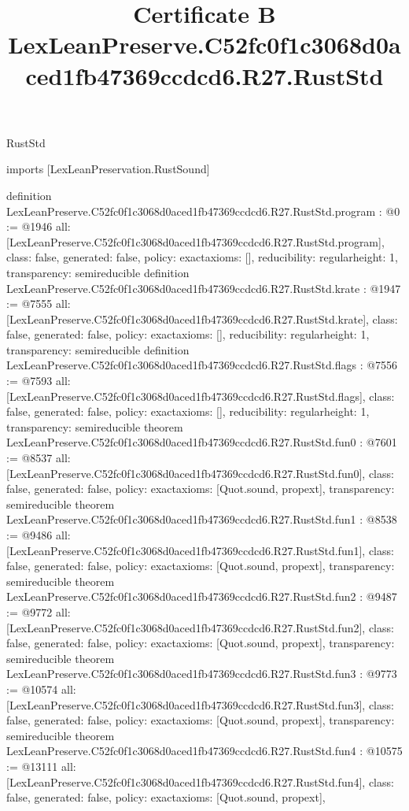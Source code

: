 \begin{lexlean}{RustStd}
\title{Certificate B LexLeanPreserve.C52fc0f1c3068d0aced1fb47369ccdcd6.R27.RustStd}
\begin{coremodule}
imports [LexLeanPreservation.RustSound]

definition LexLeanPreserve.C52fc0f1c3068d0aced1fb47369ccdcd6.R27.RustStd.program : @0 := @1946 {
  all: [LexLeanPreserve.C52fc0f1c3068d0aced1fb47369ccdcd6.R27.RustStd.program],
  class: false,
  generated: false,
  policy: exact{axioms: []},
  reducibility: regular{height: 1},
  transparency: semireducible
}
definition LexLeanPreserve.C52fc0f1c3068d0aced1fb47369ccdcd6.R27.RustStd.krate : @1947 := @7555 {
  all: [LexLeanPreserve.C52fc0f1c3068d0aced1fb47369ccdcd6.R27.RustStd.krate],
  class: false,
  generated: false,
  policy: exact{axioms: []},
  reducibility: regular{height: 1},
  transparency: semireducible
}
definition LexLeanPreserve.C52fc0f1c3068d0aced1fb47369ccdcd6.R27.RustStd.flags : @7556 := @7593 {
  all: [LexLeanPreserve.C52fc0f1c3068d0aced1fb47369ccdcd6.R27.RustStd.flags],
  class: false,
  generated: false,
  policy: exact{axioms: []},
  reducibility: regular{height: 1},
  transparency: semireducible
}
theorem LexLeanPreserve.C52fc0f1c3068d0aced1fb47369ccdcd6.R27.RustStd.fun0 : @7601 := @8537 {
  all: [LexLeanPreserve.C52fc0f1c3068d0aced1fb47369ccdcd6.R27.RustStd.fun0],
  class: false,
  generated: false,
  policy: exact{axioms: [Quot.sound, propext]},
  transparency: semireducible
}
theorem LexLeanPreserve.C52fc0f1c3068d0aced1fb47369ccdcd6.R27.RustStd.fun1 : @8538 := @9486 {
  all: [LexLeanPreserve.C52fc0f1c3068d0aced1fb47369ccdcd6.R27.RustStd.fun1],
  class: false,
  generated: false,
  policy: exact{axioms: [Quot.sound, propext]},
  transparency: semireducible
}
theorem LexLeanPreserve.C52fc0f1c3068d0aced1fb47369ccdcd6.R27.RustStd.fun2 : @9487 := @9772 {
  all: [LexLeanPreserve.C52fc0f1c3068d0aced1fb47369ccdcd6.R27.RustStd.fun2],
  class: false,
  generated: false,
  policy: exact{axioms: [Quot.sound, propext]},
  transparency: semireducible
}
theorem LexLeanPreserve.C52fc0f1c3068d0aced1fb47369ccdcd6.R27.RustStd.fun3 : @9773 := @10574 {
  all: [LexLeanPreserve.C52fc0f1c3068d0aced1fb47369ccdcd6.R27.RustStd.fun3],
  class: false,
  generated: false,
  policy: exact{axioms: [Quot.sound, propext]},
  transparency: semireducible
}
theorem LexLeanPreserve.C52fc0f1c3068d0aced1fb47369ccdcd6.R27.RustStd.fun4 : @10575 := @13111 {
  all: [LexLeanPreserve.C52fc0f1c3068d0aced1fb47369ccdcd6.R27.RustStd.fun4],
  class: false,
  generated: false,
  policy: exact{axioms: [Quot.sound, propext]},
}
\end{coremodule}
\end{lexlean}
